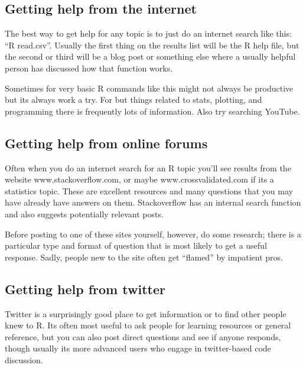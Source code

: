 \documentclass[
]{book}
\begin{document}
\hypertarget{getting-help-from-the-internet}{%
\subsection{Getting help from the internet}\label{getting-help-from-the-internet}}

The best way to get help for any topic is to just do an internet search like this: ``R read.csv''. Usually the first thing on the results list will be the R help file, but the second or third will be a blog post or something else where a usually helpful person has discussed how that function works.

Sometimes for very basic R commands like this might not always be productive but its always work a try. For but things related to stats, plotting, and programming there is frequently lots of information. Also try searching YouTube.

\hypertarget{getting-help-from-online-forums}{%
\subsection{Getting help from online forums}\label{getting-help-from-online-forums}}

Often when you do an internet search for an R topic you'll see results from the website www.stackoverflow.com, or maybe www.crossvalidated.com if its a statistics topic. These are excellent resources and many questions that you may have already have answers on them. Stackoverflow has an internal search function and also suggests potentially relevant posts.

Before posting to one of these sites yourself, however, do some research; there is a particular type and format of question that is most likely to get a useful response. Sadly, people new to the site often get ``flamed'' by impatient pros.

\hypertarget{getting-help-from-twitter}{%
\subsection{Getting help from twitter}\label{getting-help-from-twitter}}

Twitter is a surprisingly good place to get information or to find other people knew to R. Its often most useful to ask people for learning resources or general reference, but you can also post direct questions and see if anyone responds, though usually its more advanced users who engage in twitter-based code discussion.
\end{document}
